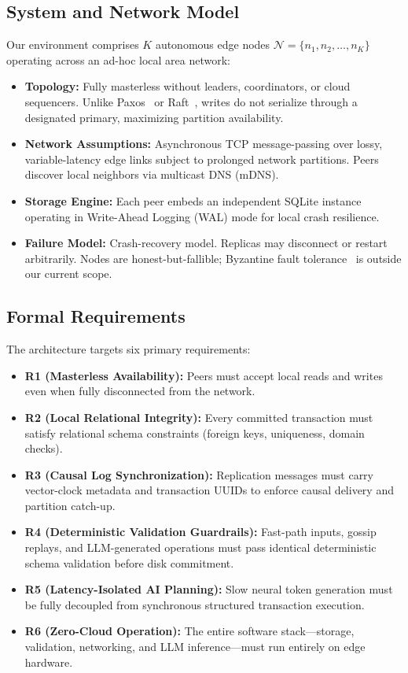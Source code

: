 \subsection{System and Network Model}
Our environment comprises $K$ autonomous edge nodes $\mathcal{N} = \{n_1, n_2, \dots, n_K\}$ operating across an ad-hoc local area network:
\begin{itemize}
    \item \textbf{Topology:} Fully masterless without leaders, coordinators, or cloud sequencers. Unlike Paxos~\cite{lamport1998part} or Raft~\cite{ongaro2014raft}, writes do not serialize through a designated primary, maximizing partition availability.
    \item \textbf{Network Assumptions:} Asynchronous TCP message-passing over lossy, variable-latency edge links subject to prolonged network partitions. Peers discover local neighbors via multicast DNS (mDNS).
    \item \textbf{Storage Engine:} Each peer embeds an independent SQLite instance~\cite{hipp2020sqlite} operating in Write-Ahead Logging (WAL) mode for local crash resilience.
    \item \textbf{Failure Model:} Crash-recovery model. Replicas may disconnect or restart arbitrarily. Nodes are honest-but-fallible; Byzantine fault tolerance~\cite{castro1999practical} is outside our current scope.
\end{itemize}

\subsection{Formal Requirements}
The architecture targets six primary requirements:
\begin{itemize}
    \item \textbf{R1 (Masterless Availability):} Peers must accept local reads and writes even when fully disconnected from the network.
    \item \textbf{R2 (Local Relational Integrity):} Every committed transaction must satisfy relational schema constraints (foreign keys, uniqueness, domain checks).
    \item \textbf{R3 (Causal Log Synchronization):} Replication messages must carry vector-clock metadata and transaction UUIDs to enforce causal delivery and partition catch-up.
    \item \textbf{R4 (Deterministic Validation Guardrails):} Fast-path inputs, gossip replays, and LLM-generated operations must pass identical deterministic schema validation before disk commitment.
    \item \textbf{R5 (Latency-Isolated AI Planning):} Slow neural token generation must be fully decoupled from synchronous structured transaction execution.
    \item \textbf{R6 (Zero-Cloud Operation):} The entire software stack---storage, validation, networking, and LLM inference---must run entirely on edge hardware.
\end{itemize}


